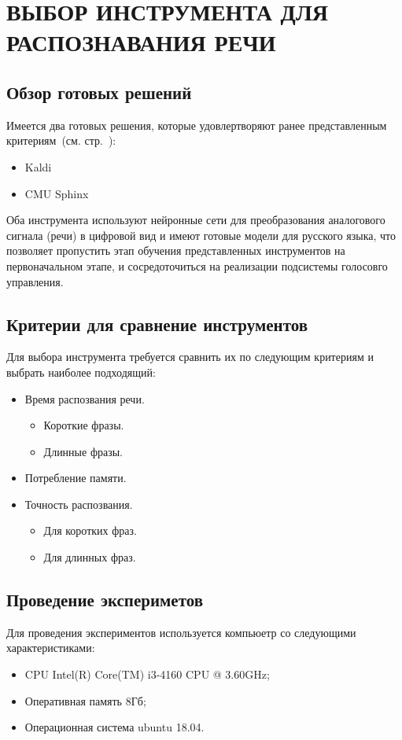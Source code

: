 \chapter{ВЫБОР ИНСТРУМЕНТА ДЛЯ РАСПОЗНАВАНИЯ РЕЧИ}

\section{Обзор готовых решений}

Имеется два готовых решения, которые удовлертворяют ранее представленным
критериям~(см. стр.~\pageref{enum:asr:cond}):
\begin{itemize}
    \item Kaldi
    \item CMU Sphinx
\end{itemize}

Оба инструмента используют нейронные сети для преобразования аналогового сигнала
(речи) в цифровой вид и имеют готовые модели для русского языка, что позволяет
пропустить этап обучения представленных инструментов на первоначальном этапе, и
сосредоточиться на реализации подсистемы голосовго управления.

\section{Критерии для сравнение инструментов}
Для выбора инструмента требуется сравнить их по следующим критериям и выбрать
наиболее подходящий:
\begin{itemize}
    \item Время распозвания речи.
    \begin{itemize}
        \item Короткие фразы.
        \item Длинные фразы.
    \end{itemize}
    \item Потребление памяти.
    \item Точность распозвания.
    \begin{itemize}
        \item Для коротких фраз.
        \item Для длинных фраз.
    \end{itemize}
\end{itemize}




\section{Проведение экспериметов}
Для проведения экспериментов используется компьюетр со следующими характеристиками:
\begin{itemize}
    \item CPU Intel(R) Core(TM) i3-4160 CPU @ 3.60GHz;
    \item Оперативная память 8Гб;
    \item Операционная система ubuntu 18.04.
\end{itemize}

